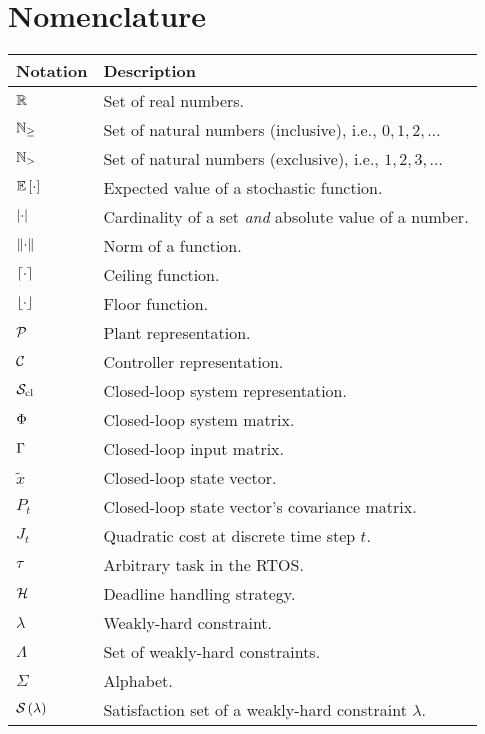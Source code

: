 \chapter*{Nomenclature}%
%
\vspace{-1.75cm}

\begin{table*}[h]
    \centering
    \begin{tabular}{l|l}%
        \textbf{Notation} & \textbf{Description} \\\hline
        $\mathbb{R}$ & Set of real numbers. \\
        $\mathbb{N}_{\geq}$ & Set of natural numbers (inclusive), i.e., $0, 1, 2, \ldots$ \\
        $\mathbb{N}_{>}$ & Set of natural numbers (exclusive), i.e., $1, 2, 3, \ldots$ \\
        $\mathbb{E}\left[ \cdot \right]$ & Expected value of a stochastic function. \\
        $\left|\cdot\right|$ & Cardinality of a set \emph{and} absolute value of a number. \\
        $\lVert\cdot\rVert$ & Norm of a function. \\
        $\lceil\cdot\rceil$ & Ceiling function. \\
        $\lfloor\cdot\rfloor$ & Floor function. \\
        $\mathcal{P}$ & Plant representation. \\
        $\mathcal{C}$ & Controller representation. \\
        $\mathcal{S}_{\text{cl}}$ & Closed-loop system representation. \\
        $\Phi$ & Closed-loop system matrix. \\
        $\Gamma$ & Closed-loop input matrix. \\
        $\tilde x$ & Closed-loop state vector. \\
        $P_t$ & Closed-loop state vector's covariance matrix. \\
        $J_t$ & Quadratic cost at discrete time step $t$. \\
        $\tau$ & Arbitrary task in the RTOS. \\
        $\mathcal{H}$ & Deadline handling strategy. \\
        $\lambda$ & Weakly-hard constraint. \\
        $\Lambda$ & Set of weakly-hard constraints. \\
        $\Sigma$ & Alphabet. \\
        $\mathcal{S}_{}\left( \lambda \right)$ & Satisfaction set of a weakly-hard constraint $\lambda$. \\

\end{tabular}
\end{table*}
